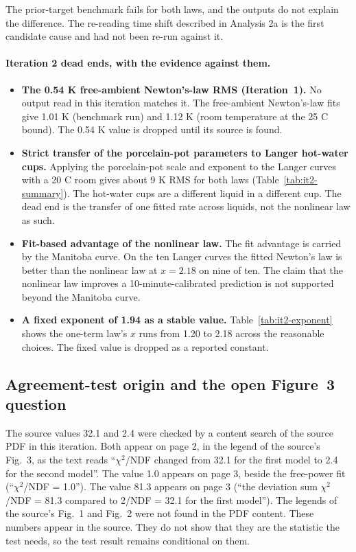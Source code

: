 \documentclass[11pt,letterpaper]{article}
\begin{document}
The prior-target benchmark fails for both laws, and the outputs do not explain the difference. The re-reading time shift described in Analysis 2a is the first candidate cause and had not been re-run against it.

\paragraph{Iteration 2 dead ends, with the evidence against them.}
\begin{itemize}
\item \textbf{The 0.54 K free-ambient Newton's-law RMS (Iteration~1).} No output read in this iteration matches it. The free-ambient Newton's-law fits give 1.01 K (benchmark run) and 1.12 K (room temperature at the 25 C bound). The 0.54 K value is dropped until its source is found.
\item \textbf{Strict transfer of the porcelain-pot parameters to Langer hot-water cups.} Applying the porcelain-pot scale and exponent to the Langer curves with a 20 C room gives about 9 K RMS for both laws (Table~\ref{tab:it2-summary}). The hot-water cups are a different liquid in a different cup. The dead end is the transfer of one fitted rate across liquids, not the nonlinear law as such.
\item \textbf{Fit-based advantage of the nonlinear law.} The fit advantage is carried by the Manitoba curve. On the ten Langer curves the fitted Newton's law is better than the nonlinear law at $x = 2.18$ on nine of ten. The claim that the nonlinear law improves a 10-minute-calibrated prediction is not supported beyond the Manitoba curve.
\item \textbf{A fixed exponent of 1.94 as a stable value.} Table~\ref{tab:it2-exponent} shows the one-term law's $x$ runs from 1.20 to 2.18 across the reasonable choices. The fixed value is dropped as a reported constant.
\end{itemize}

\subsection{Agreement-test origin and the open Figure~3 question}

The source values 32.1 and 2.4 were checked by a content search of the source PDF in this iteration. Both appear on page 2, in the legend of the source's Fig.~3, as the text reads ``$\chi^2$/NDF changed from 32.1 for the first model to 2.4 for the second model''. The value 1.0 appears on page 3, beside the free-power fit (``$\chi^2$/NDF = 1.0''). The value 81.3 appears on page 3 (``the deviation sum $\chi^2$/NDF = 81.3 compared to 2/NDF = 32.1 for the first model''). The legends of the source's Fig.~1 and Fig.~2 were not found in the PDF content. These numbers appear in the source. They do not show that they are the statistic the test needs, so the test result remains conditional on them.
\end{document}
